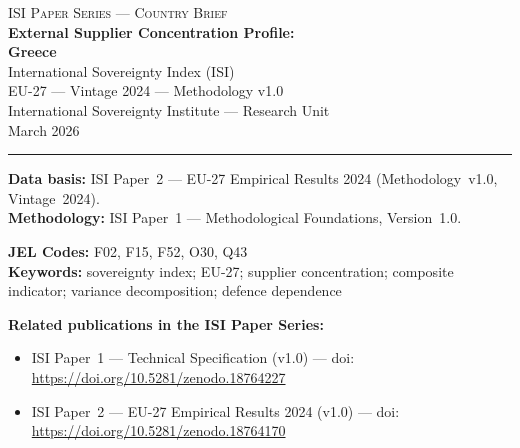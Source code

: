 \documentclass[12pt,a4paper]{article}
\begin{document}
\hypersetup{pageanchor=false}

\begin{titlepage}
\centering
\vspace*{2cm}
{\Large\textsc{ISI Paper Series --- Country Brief}}\\[1.2cm]
{\LARGE\bfseries External Supplier Concentration Profile:\\[0.3em]
Greece}\\[1.5cm]
{\large International Sovereignty Index (ISI)\\[0.3em]
EU-27 --- Vintage 2024 --- Methodology v1.0}\\[1.2cm]
{\large International Sovereignty Institute --- Research Unit}\\[0.8cm]
{\large March 2026}

\vspace{0.8cm}
\noindent\rule{\textwidth}{0.4pt}
\vspace{0.4cm}

\begin{flushleft}
\noindent\textbf{Data basis:} ISI Paper~2 --- EU-27 Empirical Results 2024 (Methodology~v1.0, Vintage~2024).\\[4pt]
\noindent\textbf{Methodology:} ISI Paper~1 --- Methodological Foundations, Version~1.0.

\medskip

\noindent\textbf{JEL Codes:} F02, F15, F52, O30, Q43\\[4pt]
\noindent\textbf{Keywords:} sovereignty index; EU-27; supplier concentration; composite indicator; variance decomposition; defence dependence

\medskip

\noindent\textbf{Related publications in the ISI Paper Series:}
\begin{itemize}[nosep,leftmargin=1.5em]
\item ISI Paper~1 --- Technical Specification (v1.0) --- doi:\\
  \url{https://doi.org/10.5281/zenodo.18764227}
\item ISI Paper~2 --- EU-27 Empirical Results 2024 (v1.0) --- doi:\\
  \url{https://doi.org/10.5281/zenodo.18764170}
\end{itemize}
\end{flushleft}
\vfill
\end{titlepage}
\end{document}

